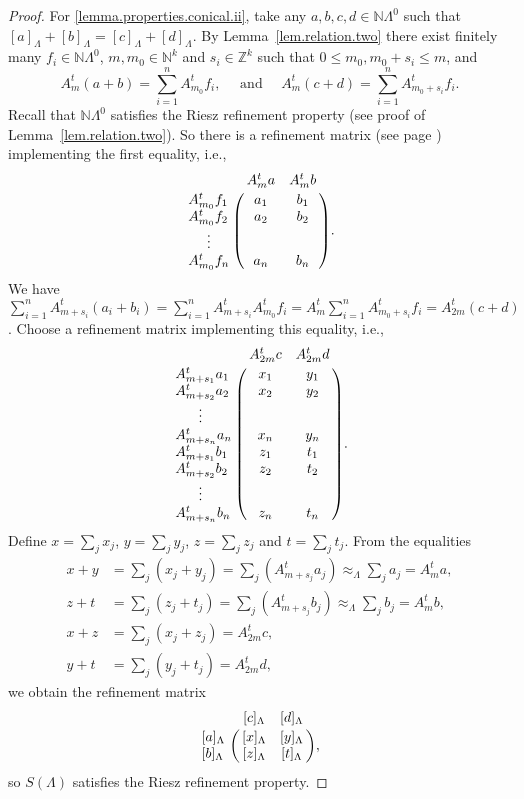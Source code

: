 \documentclass[a4paper, 12pt]{amsart}
\numberwithin{equation}{section}
\theoremstyle{remark}
\theoremstyle{definition}
\begin{document}
\begin{proof}
For \eqref{lemma.properties.conical.ii}, take any $a, b, c, d\in {\mathbb{N}}\Lambda^0$ such that
${{[{a}]_\Lambda}}+{{[{b}]_\Lambda}}={{[{c}]_\Lambda}}+{{[{d}]_\Lambda}}$. By Lemma~\ref{lem.relation.two} there exist
finitely many $f_i\in  {\mathbb{N}} \Lambda^0$, $m,m_0\in {\mathbb{N}}^k$ and $s_i\in {\mathbb{Z}}^k$ such that
$0\leq m_0,m_0+s_i\leq m$, and
$$A^t_m(a+b)=\sum_{i=1}^nA^t_{m_0}f_i, \quad\textrm{ and } \quad A^t_m(c+d)=\sum_{i=1}^n A^t_{m_0+s_i}f_i.$$
Recall that ${\mathbb{N}}\Lambda^0$ satisfies the Riesz refinement property (see proof of
Lemma~\ref{lem.relation.two}). So there is a refinement matrix (see page \pageref{ref.matrix}) implementing the first
equality, i.e.,
$$\bordermatrix{
 &A^t_m a&A^t_m b\cr  A^t_{m_0} f_1&a_1&b_1\cr  A^t_{m_0} f_2&a_2&b_2\cr \ \ \ \ \vdots & & \cr  A^t_{m_0} f_n&a_n&b_n\cr}.$$
 We have $\sum_{i=1}^n A^t_{m+s_i}(a_i+b_i)=\sum_{i=1}^n A^t_{m+s_i}A^t_{m_0}f_i=A^t_m\sum_{i=1}^n A^t_{m_0+s_i}f_i=A^t_{2m}(c+d)$. Choose a refinement matrix implementing this equality, i.e.,
 $$\bordermatrix{
 &A^t_{2m} c&A^t_{2m} d\cr  A^t_{m+s_1} a_1&x_1&y_1\cr  A^t_{m+s_2} a_2&x_2&y_2\cr \ \ \ \ \ \vdots & &\cr  A^t_{m+s_n} a_n&x_n&y_n\cr  A^t_{m+s_1} b_1&z_1&t_1\cr  A^t_{m+s_2} b_2&z_2&t_2\cr  \ \ \ \ \ \vdots & & \cr  A^t_{m+s_n} b_n&z_n&t_n\cr}.$$
 Define $x=\sum_j x_j$, $y=\sum_j y_j$, $z=\sum_j z_j$ and $t=\sum_j t_j$. From the equalities
 \begin{align*}
 x+y & =\sum_j(x_j+y_j)=\sum_j (A^t_{m+s_j} a_j) \approx_{\Lambda} \sum_j a_j = A^t_m a,\\
 z+t & =\sum_j(z_j+t_j)=\sum_j (A^t_{m+s_j} b_j) \approx_{\Lambda} \sum_j b_j = A^t_m b,\\
 x+z & =\sum_j(x_j+z_j) = A^t_{2m} c, \\
 y+t & =\sum_j(y_j+t_j) = A^t_{2m} d,
 \end{align*}
 we obtain the refinement matrix
$$\bordermatrix{
 &{{[{c}]_\Lambda}}&{{[{d}]_\Lambda}}\cr  {{[{a}]_\Lambda}}&{{[{x}]_\Lambda}}&{{[{y}]_\Lambda}}\cr  {{[{b}]_\Lambda}}&{{[{z}]_\Lambda}}&{{[{t}]_\Lambda}}\cr},$$
so $S(\Lambda)$ satisfies the Riesz refinement property.


\end{proof}
\end{document}
